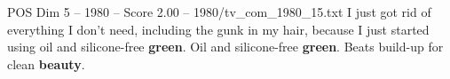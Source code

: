 \begin{textsample}{POS Dim 5 – 1980 – Score 2.00 – 1980/tv\_com\_1980\_15.txt}  \label{ex:f5_pos_006}
I just got rid of everything I don't need, including the gunk in my hair, because I just started using oil and silicone-free \textbf{green}.
Oil and silicone-free \textbf{green}.
Beats build-up for clean \textbf{beauty}.

\end{textsample}
